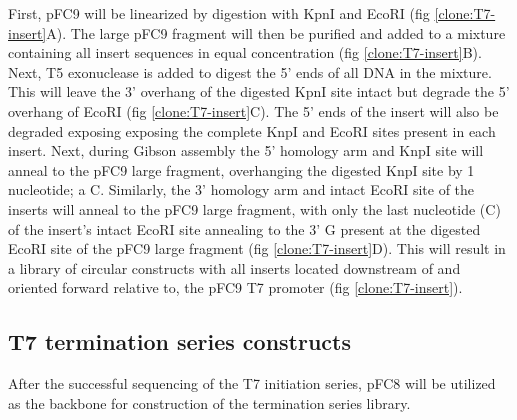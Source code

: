 \documentclass[11pt]{article}
\begin{document}
First, pFC9 will be linearized by digestion with KpnI and EcoRI  (fig \ref{clone:T7-insert}A). The large pFC9 fragment will then be purified and added to a mixture containing all insert sequences in equal concentration  (fig \ref{clone:T7-insert}B). Next, T5 exonuclease is added to digest the 5' ends of all DNA in the mixture. This will leave the 3' overhang of the digested KpnI site intact but degrade the 5' overhang of EcoRI  (fig \ref{clone:T7-insert}C). The 5' ends of the insert will also be degraded exposing exposing the complete KnpI and EcoRI sites present in each insert. Next, during Gibson assembly the 5' homology arm and KnpI site will anneal to the pFC9 large fragment, overhanging the digested KnpI site by 1 nucleotide; a C. Similarly, the 3' homology arm and intact EcoRI site of the inserts will anneal to the pFC9 large fragment, with only the last nucleotide (C) of the insert's intact EcoRI site annealing to the 3' G present at the digested EcoRI site of the pFC9 large fragment (fig \ref{clone:T7-insert}D). This will result in a library of circular constructs with all inserts located downstream of and oriented forward relative to, the pFC9 T7 promoter (fig \ref{clone:T7-insert}). 


\subsection{T7 termination series constructs}

After the successful sequencing of the T7 initiation series, pFC8 will be utilized as the backbone for construction of the termination series library. 
\end{document}
